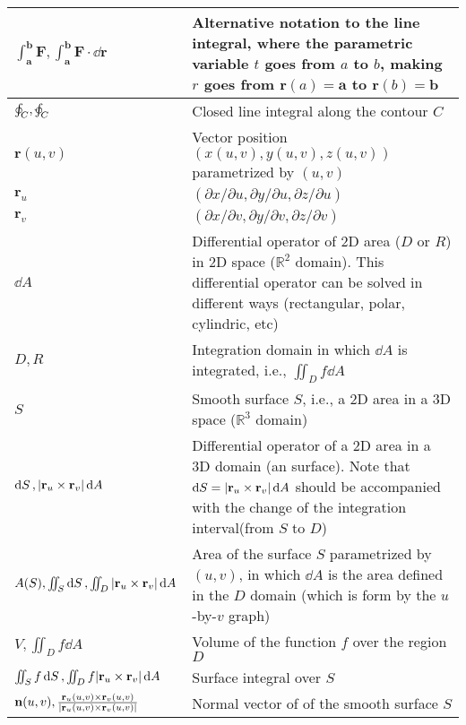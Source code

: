 \documentclass{article}
\begin{document}
\begin{xltabular}{\textwidth}{XX}
    \(\int_\mathbf{a}^\mathbf{b} \mathbf{F}, \int_\mathbf{a}^\mathbf{b} \mathbf{F}\cdot\dd{\mathbf{r}}\) & Alternative notation to the line integral, where the parametric variable \(t\) goes from \(a\) to \(b\), making \(r\) goes from \(\mathbf{r}(a) = \mathbf{a}\) to \(\mathbf{r}(b) = \mathbf{b}\) \cite{apostolCalculus2ndEdn1967} \\ \hline
    \(\oint_C, \varointctrclockwise_C\) & Closed line integral along the contour \(C\) \\ \hline
    \(\mathbf{r}(u,v)\) & Vector position \((x(u,v), y(u,v), z(u,v))\) parametrized by \((u,v)\)\\ \hline
    \(\mathbf{r}_u\) & \((\partial x/ \partial u, \partial y/ \partial u, \partial z/ \partial u)\)\\ \hline
    \(\mathbf{r}_v\) & \((\partial x/ \partial v, \partial y/ \partial v, \partial z/ \partial v)\)\\ \hline
    \(\dd{A}\) & Differential operator of 2D area (\(D\) or \(R\)) in 2D space (\(\mathbb{R}^2\) domain). This differential operator can be solved in different ways (rectangular, polar, cylindric, etc) \cite{stewartCalculus2011} \\ \hline
    \(D, R\) & Integration domain in which \(\dd{A}\) is integrated, i.e., \(\iint_D f \dd{A}\) \cite{stewartCalculus2011} \\ \hline
    \(S\)& Smooth surface \(S\), i.e., a 2D area in a 3D space (\(\mathbb{R}^3\) domain) \\ \hline
    \(\dd{S}, \abs{\mathbf{r}_u\times\mathbf{r}_v} \dd{A} \)& Differential operator of a 2D area in a 3D domain (an surface). Note that \(\dd{S} = \abs{\mathbf{r}_u\times\mathbf{r}_v} \dd{A}\) should be accompanied with the change of the integration interval(from \(S\) to \(D\)) \\ \hline
    \(A(S), \iint_S \dd{S}, \iint_D \abs{\mathbf{r}_u\times\mathbf{r}_v} \dd{A}\) & Area of the surface \(S\) parametrized by \((u,v)\), in which \(\dd{A}\) is the area defined in the \(D\) domain (which is form by the \(u\)-by-\(v\) graph)\\ \hline
    \(V, \iint_D f \dd{A}\) & Volume of the function \(f\) over the region \(D\) \\ \hline
    \(\iint_S f \dd{S}, \iint_D f \abs{\mathbf{r}_u\times\mathbf{r}_v} \dd{A}\)& Surface integral over \(S\) \\ \hline
    \(\mathbf{n}(u,v), \frac{\mathbf{r}_u(u,v)\times\mathbf{r}_v(u,v)}{\abs{\mathbf{r}_u(u,v)\times\mathbf{r}_v(u,v)}}\) & Normal vector of of the smooth surface \(S\) \\ \hline

\end{xltabular}
\end{document}
